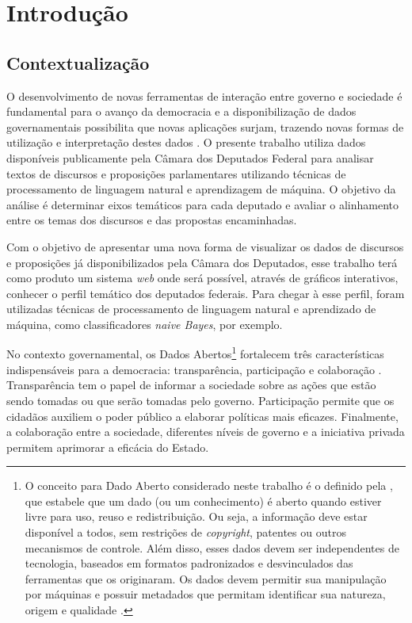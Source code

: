 \chapter{Introdução}

\section{Contextualização}
\label{sec:contextualização}

O desenvolvimento de novas ferramentas de interação entre governo e sociedade é fundamental para o avanço da democracia e a disponibilização de dados governamentais possibilita que novas aplicações surjam, trazendo novas formas de utilização e interpretação destes dados \cite{consegi2011}. O presente trabalho utiliza dados disponíveis publicamente pela Câmara dos Deputados Federal para analisar textos de discursos e proposições parlamentares utilizando técnicas de processamento de linguagem natural e aprendizagem de máquina. O objetivo da análise é determinar eixos temáticos para cada deputado e avaliar o alinhamento entre os temas dos discursos e das propostas encaminhadas.

Com o objetivo de apresentar uma nova forma de visualizar os dados de discursos e proposições já disponibilizados pela Câmara dos Deputados, esse trabalho terá como produto um sistema \textit{web} onde será possível, através de gráficos interativos, conhecer o perfil temático dos deputados federais. Para chegar à esse perfil, foram utilizadas técnicas de processamento de linguagem natural e aprendizado de máquina, como classificadores \textit{naive Bayes}, por exemplo.

No contexto governamental, os Dados Abertos\footnote{O conceito para Dado Aberto considerado neste trabalho é o definido pela , que estabele que um dado (ou um conhecimento) é aberto quando estiver livre para uso, reuso e redistribuição. Ou seja, a informação deve estar disponível a todos, sem restrições de \textit{copyright}, patentes ou outros mecanismos de controle. Além disso, esses dados devem ser independentes de tecnologia, baseados em formatos padronizados e desvinculados das ferramentas que os originaram. Os dados devem permitir sua manipulação por máquinas e possuir metadados que permitam identificar sua natureza, origem e qualidade \cite{diniz2010}.} fortalecem três características indispensáveis para a democracia: transparência, participação e colaboração \cite{consegi2011}. Transparência tem o papel de informar a sociedade sobre as ações que estão sendo tomadas ou que serão tomadas pelo governo. Participação permite que os cidadãos auxiliem o poder público a elaborar políticas mais eficazes. Finalmente, a colaboração entre a sociedade, diferentes níveis de governo e a iniciativa privada permitem aprimorar a eficácia do Estado.

